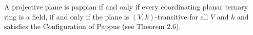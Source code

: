 A projective plane is pappian if and only if every coordinating planar ternary ring is a field, if and only if the plane is $(V,k)$-transitive for all $V$ and $k$ and satisfies the Configuration of Pappus (see Theorem 2.6).
